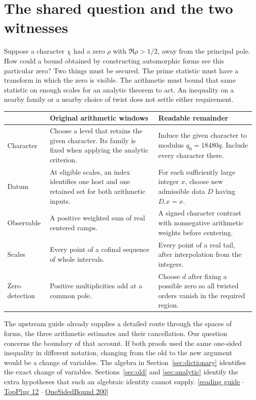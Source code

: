 \documentclass[12pt,letterpaper]{article}
\begin{document}
\section{The shared question and the two witnesses}
Suppose a character $\chi$ had a zero $\rho$ with $\Re\rho>1/2$, away from the principal pole. How could a bound obtained by constructing automorphic forms see this particular zero? Two things must be secured. The prime statistic must have a transform in which the zero is visible. The arithmetic must bound that same statistic on enough scales for an analytic theorem to act. An inequality on a nearby family or a nearby choice of twist does not settle either requirement.

\begin{center}\small
\begin{tabularx}{\linewidth}{@{}p{.17\linewidth}YY@{}}\toprule
 & Original arithmetic windows & Readable remainder\\\midrule
Character & Choose a level that retains the given character. Its family is fixed when applying the analytic criterion. & Induce the given character to modulus $q_0=18480q$. Include every character there.\\
Datum & At eligible scales, an index identifies one host and one retained set for both arithmetic inputs. & For each sufficiently large integer $x$, choose new admissible data $D$ having $D.x=x$.\\
Observable & A positive weighted sum of real centered ramps. & A signed character contrast with nonnegative arithmetic weights before centering.\\
Scales & Every point of a cofinal sequence of whole intervals. & Every point of a real tail, after interpolation from the integers.\\
Zero detection & Positive multiplicities add at a common pole. & Choose $d$ after fixing a possible zero so all twisted orders vanish in the required region.\\\bottomrule
\end{tabularx}\end{center}

The upstream guide already supplies a detailed route through the spaces of forms, the three arithmetic estimates and their cancellation. Our question concerns the boundary of that account. If both proofs used the same one-sided inequality in different notation, changing from the old to the new argument would be a change of variables. The algebra in Section~\ref{sec:dictionary} identifies the exact change of variables. Sections~\ref{sec:old} and \ref{sec:analytic} identify the extra hypotheses that such an algebraic identity cannot supply. {\small\sffamily\color{mute}[\href{https://github.com/leanprover-community/riemann-hypothesis/blob/e063a923620ee7787b4a1270421478645bf66bdb/GUIDE.md#L1}{reading guide} $\cdot$ \href{https://github.com/nousentllc/riemann-hypothesis/blob/40e56bab026552e089d7afcfeff08d2defb9c005/src/Development/AutomorphicArithmetic/ThetaCorrespondence/ThetaPairLifts/ThirdPlaceSeries/TopPlug.lean#L12}{TopPlug 12} $\cdot$ \href{https://github.com/leanprover-community/riemann-hypothesis/blob/e063a923620ee7787b4a1270421478645bf66bdb/src/New/Reduction/OneSidedBound.lean#L200}{OneSidedBound 200}]}
\end{document}
